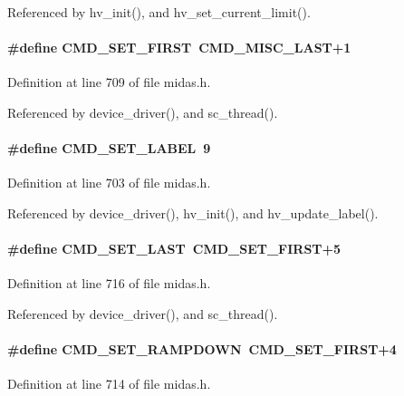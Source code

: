 Referenced by hv\_\-init(), and hv\_\-set\_\-current\_\-limit().
\paragraph[{CMD\_\-SET\_\-FIRST}]{\setlength{\rightskip}{0pt plus 5cm}\#define CMD\_\-SET\_\-FIRST~CMD\_\-MISC\_\-LAST+1}\hfill\label{group__err26_ga3ee43155ccdffd4f1ce480a5a078d33e}


Definition at line 709 of file midas.h.

Referenced by device\_\-driver(), and sc\_\-thread().
\paragraph[{CMD\_\-SET\_\-LABEL}]{\setlength{\rightskip}{0pt plus 5cm}\#define CMD\_\-SET\_\-LABEL~9}\hfill\label{group__err26_gaa0706cd66be2ae6e198adc217c2ad9bf}


Definition at line 703 of file midas.h.

Referenced by device\_\-driver(), hv\_\-init(), and hv\_\-update\_\-label().
\paragraph[{CMD\_\-SET\_\-LAST}]{\setlength{\rightskip}{0pt plus 5cm}\#define CMD\_\-SET\_\-LAST~CMD\_\-SET\_\-FIRST+5}\hfill\label{group__err26_ga3c5f7e38133a18c2bdc72fc11358bf9a}


Definition at line 716 of file midas.h.

Referenced by device\_\-driver(), and sc\_\-thread().
\paragraph[{CMD\_\-SET\_\-RAMPDOWN}]{\setlength{\rightskip}{0pt plus 5cm}\#define CMD\_\-SET\_\-RAMPDOWN~CMD\_\-SET\_\-FIRST+4}\hfill\label{group__err26_gafbd1844707a6b9a25d40ef1848ce750f}


Definition at line 714 of file midas.h.

